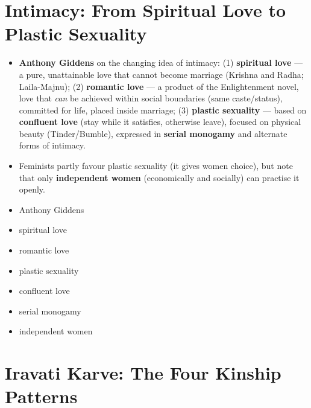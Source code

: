 \section{Intimacy: From Spiritual Love to Plastic Sexuality}

\begin{KeyConcept}
\begin{itemize}
\item \textbf{Anthony Giddens} on the changing idea of intimacy: (1) \textbf{spiritual love} --- a pure, unattainable love that cannot become marriage (Krishna and Radha; Laila-Majnu); (2) \textbf{romantic love} --- a product of the Enlightenment novel, love that \emph{can} be achieved within social boundaries (same caste/status), committed for life, placed inside marriage; (3) \textbf{plastic sexuality} --- based on \textbf{confluent love} (stay while it satisfies, otherwise leave), focused on physical beauty (Tinder/Bumble), expressed in \textbf{serial monogamy} and alternate forms of intimacy.
\item Feminists partly favour plastic sexuality (it gives women choice), but note that only \textbf{independent women} (economically and socially) can practise it openly.
\end{itemize}
\end{KeyConcept}

\begin{QuickRevision}
\begin{itemize}
\item Anthony Giddens
\item spiritual love
\item romantic love
\item plastic sexuality
\item confluent love
\item serial monogamy
\item independent women
\end{itemize}
\end{QuickRevision}

\section{Iravati Karve: The Four Kinship Patterns}

